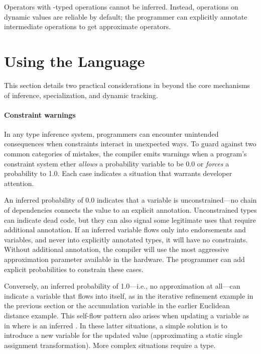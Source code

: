 Operators with -typed operations cannot be
inferred.
Instead, operations on dynamic values are reliable by default; the programmer
can explicitly annotate intermediate operations to get approximate operators.



\section{Using the Language}
\label{decaf:sec:practice}

This section details two practical considerations in \lang beyond the core
mechanisms of inference, specialization, and dynamic tracking.

\paragraph{Constraint warnings}
\label{decaf:sec:warn}

In any type inference system, programmers can encounter unintended
consequences when constraints interact in unexpected ways.
To guard against two common categories of mistakes, the \lang compiler emits
warnings when a program's constraint system ether \emph{allows} a probability
variable to be 0.0 or \emph{forces} a probability to 1.0.
Each case indicates a situation that warrants developer attention.

An inferred probability of 0.0 indicates that a variable is unconstrained---no
chain of dependencies connects the value to an explicit annotation.
Unconstrained types can indicate dead code, but they can also signal some
legitimate uses that require additional annotation.
If an inferred variable flows only into endorsements and 
variables, and never into explicitly annotated types, it will have no
constraints.
Without additional annotation, the compiler will use the most aggressive
approximation parameter available in the hardware.
The programmer can add explicit probabilities to constrain these cases.

Conversely, an inferred probability of 1.0---i.e., no approximation at
all---can indicate a variable that flows into itself, as in the iterative
refinement example in the previous section or the  accumulation
variable in the earlier Euclidean distance example.
This self-flow pattern also arises when updating a variable as in
 where  is an inferred .
In these latter situations, a simple solution is to introduce a new
variable for the updated value (approximating a static single assignment
transformation).
More complex situations require a  type.


